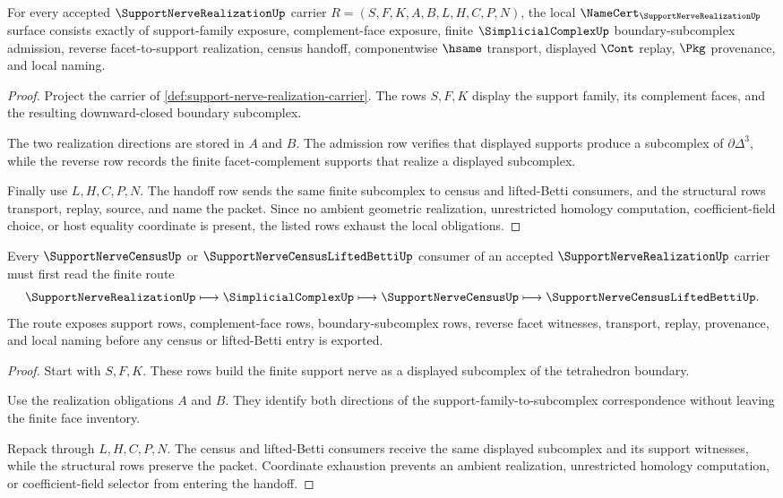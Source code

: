 \begin{theorem}
\label{thm:support-nerve-realization-namecert-obligations}
For every accepted $\SupportNerveRealizationUp$ carrier $R=(S,F,K,A,B,L,H,C,P,N)$, the local $\NameCert_{\SupportNerveRealizationUp}$ surface consists exactly of support-family exposure, complement-face exposure, finite $\SimplicialComplexUp$ boundary-subcomplex admission, reverse facet-to-support realization, census handoff, componentwise $\hsame$ transport, displayed $\Cont$ replay, $\Pkg$ provenance, and local naming.
\end{theorem}
\begin{proof}
Project the carrier of \autoref{def:support-nerve-realization-carrier}. The rows $S,F,K$ display the support family, its complement faces, and the resulting downward-closed boundary subcomplex.

The two realization directions are stored in $A$ and $B$. The admission row verifies that displayed supports produce a subcomplex of $\partial\Delta^3$, while the reverse row records the finite facet-complement supports that realize a displayed subcomplex.

Finally use $L,H,C,P,N$. The handoff row sends the same finite subcomplex to census and lifted-Betti consumers, and the structural rows transport, replay, source, and name the packet. Since no ambient geometric realization, unrestricted homology computation, coefficient-field choice, or host equality coordinate is present, the listed rows exhaust the local obligations.
\end{proof}

\begin{theorem}
\label{thm:support-nerve-realization-census-handoff}
Every $\SupportNerveCensusUp$ or $\SupportNerveCensusLiftedBettiUp$ consumer of an accepted $\SupportNerveRealizationUp$ carrier must first read the finite route
$$
\SupportNerveRealizationUp
\longmapsto
\SimplicialComplexUp
\longmapsto
\SupportNerveCensusUp
\longmapsto
\SupportNerveCensusLiftedBettiUp .
$$
The route exposes support rows, complement-face rows, boundary-subcomplex rows, reverse facet witnesses, transport, replay, provenance, and local naming before any census or lifted-Betti entry is exported.
\end{theorem}
\begin{proof}
Start with $S,F,K$. These rows build the finite support nerve as a displayed subcomplex of the tetrahedron boundary.

Use the realization obligations $A$ and $B$. They identify both directions of the support-family-to-subcomplex correspondence without leaving the finite face inventory.

Repack through $L,H,C,P,N$. The census and lifted-Betti consumers receive the same displayed subcomplex and its support witnesses, while the structural rows preserve the packet. Coordinate exhaustion prevents an ambient realization, unrestricted homology computation, or coefficient-field selector from entering the handoff.
\end{proof}

